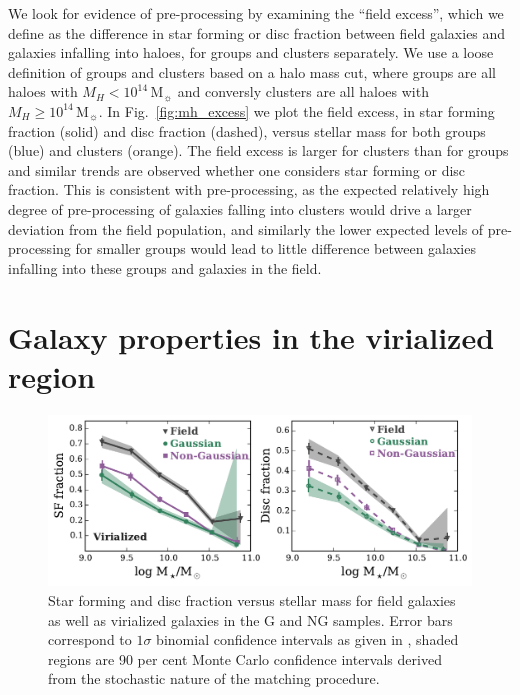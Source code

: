 \documentclass[a4paper,fleqn,usenatbib]{mnras}
\newcommand{\Msun}{\,\mathrm{M_{\sun}}}
\begin{document}
We look for evidence of pre-processing by examining the ``field
excess'', which we define as the difference in star forming or disc
fraction between field galaxies and galaxies infalling into haloes,
for groups and clusters separately.  We use a loose definition of
groups and clusters based on a halo mass cut, where groups are all
haloes with $M_H < 10^{14}\Msun$ and conversly clusters are all
haloes with $M_H \ge 10^{14}\Msun$.  In Fig.~\ref{fig:mh_excess} we
plot the field excess, in star forming fraction (solid) and disc
fraction (dashed), versus stellar mass for both groups (blue) and
clusters (orange).  The field excess is larger for clusters than for
groups and similar trends are observed whether one considers star
forming or disc fraction.  This is consistent with pre-processing, as
the expected
relatively high degree of pre-processing of galaxies falling into
clusters would drive a larger deviation from the field population, and
similarly the lower expected levels of pre-processing for smaller
groups would lead to little difference between galaxies infalling into
these groups and galaxies in the field.


\section{Galaxy properties in the virialized region}
\label{sec:virial}

\begin{figure}
  \centering
  \includegraphics[width=\textwidth]{disk_sfFrac_w2_v.pdf}
  \caption{Star forming and disc fraction versus stellar mass for
    field galaxies as well as virialized galaxies in the G and NG
    samples.  Error bars correspond to $1 \sigma$ binomial confidence
    intervals as given in \citet{cameron2011}, shaded regions are 90
    per cent Monte Carlo confidence intervals derived from the
    stochastic nature of the matching procedure.}
  \label{fig:disk_sfFrac_v}
\end{figure}
\end{document}
